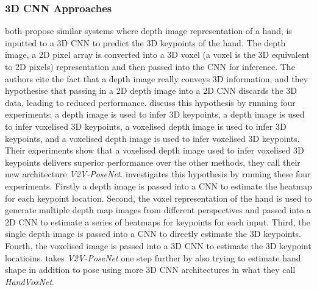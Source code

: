 \subsubsection{3D CNN Approaches}

\cite{moon2018v2v, ge2018real} both propose similar systems where depth image representation of a hand, is inputted to a 3D CNN to predict the 3D keypoints of the hand. The depth image, a 2D pixel array is converted into a 3D voxel (a voxel is the 3D equivalent to 2D pixels) representation and then passed into the CNN for inference. The authors cite the fact that a depth image really conveys 3D information, and they hypothesise that passing in a 2D depth image into a 2D CNN discards the 3D data, leading to reduced performance. \cite{moon2018v2v} discuss this hypothesis by running four experiments; a depth image is used to infer 3D keypoints, a depth image is used to infer voxelised 3D keypoints, a voxelised depth image is used to infer 3D keypoints, and a voxelised depth image is used to infer voxelised 3D keypoints. Their experiments show that a voxelised depth image used to infer voxelised 3D keypoints delivers superior performance over the other methods, they call their new architecture {\slshape V2V-PoseNet}. \cite{ge2018real} investigates this hypothesis by running these four experiments. Firstly a depth image is passed into a CNN to estimate the heatmap for each keypoint location. Second, the voxel representation of the hand is used to generate multiple depth map images from different perspectives and passed into a 2D CNN to estimate a series of heatmaps for keypoints for each input. Third, the single depth image is passed into a CNN to directly estimate the 3D keypoints. Fourth, the voxelised image is passed into a 3D CNN to estimate the 3D keypoint locatioins. \cite{malik2020handvoxnet} takes {\slshape V2V-PoseNet} one step further by also trying to estimate hand shape in addition to pose using more 3D CNN architectures in what they call {\slshape HandVoxNet}.

